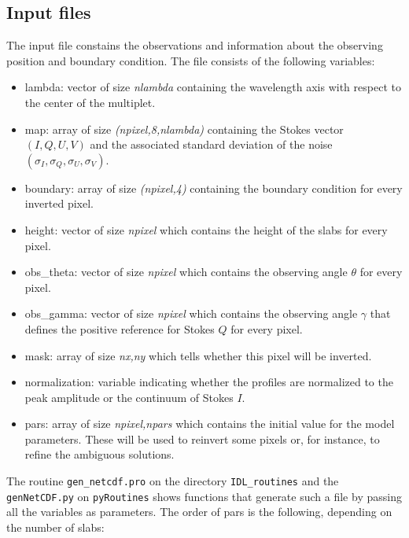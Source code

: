 \documentclass[12pt]{article}
\begin{document}
\subsection{Input files}
The input file constains the
observations and information about the observing position and boundary condition. The file
consists of the following variables:
\begin{itemize}
\item lambda: vector of size \textit{nlambda} containing the wavelength axis with respect to the center of the multiplet.
\item map: array of size \textit{(npixel,8,nlambda)} containing the Stokes vector $(I,Q,U,V)$ and
the associated standard deviation of the noise $(\sigma_I,\sigma_Q,\sigma_U,\sigma_V)$.
\item boundary: array of size \textit{(npixel,4)} containing the boundary condition for every inverted pixel.
\item height: vector of size \textit{npixel} which contains the height of the slabs for every pixel.
\item obs\_theta: vector of size \textit{npixel} which contains the observing angle $\theta$ for every pixel.
\item obs\_gamma: vector of size \textit{npixel} which contains the observing angle $\gamma$ that defines the positive
reference for Stokes $Q$ for every pixel.
\item mask: array of size \textit{nx,ny} which tells whether this pixel will be inverted.
\item normalization: variable indicating whether the profiles are normalized to the peak amplitude or the continuum of Stokes $I$.
\item pars: array of size \textit{npixel,npars} which contains the initial value for the model parameters. These will be
used to reinvert some pixels or, for instance, to refine the ambiguous solutions.
\end{itemize}
The routine \texttt{gen\_netcdf.pro} on the directory \texttt{IDL\_routines} and the \texttt{genNetCDF.py} on \texttt{pyRoutines} shows functions that
generate such a file by passing all the variables as parameters.
The order of pars is the following, depending on the number of slabs:
\end{document}
